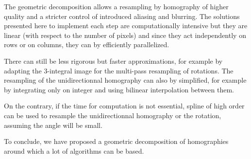 









The geometric decomposition allows a resampling by homography of higher quality and a stricter control of introduced aliasing and blurring. The solutions presented here to implement each step are computationally intensive but they are linear (with respect to the number of pixels) and since they act independently on rows or on columns, they can by efficiently parallelized.

There can still be less rigorous but faster approximations, for example by adapting the 3-integral image for the multi-pass resampling of rotations. The resampling of the unidirectionnal homography can also by simplified, for example by integrating only on integer and using bilinear interpolation between them.

On the contrary, if the time for computation is not essential, spline of high order can be used to resample the unidirectionnal homography or the rotation, assuming the angle will be small.

To conclude, we have proposed a geometric decomposition of homographies around which a lot of algorithms can be based.
